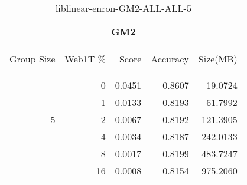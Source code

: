\begin{center}
\begin{table}[htbp] 
 \begin{center}
\begin{tabular}{ | r | r | r | r | r |}
\hline
\multicolumn{5}{|c|}{GM2}\\
\hline
\begin{sideways}Group Size\end{sideways} & \begin{sideways}Web1T \%\end{sideways} & \begin{sideways}Score\end{sideways} & \begin{sideways}Accuracy\end{sideways} & \begin{sideways}Size(MB)\end{sideways}\\
\hline
\multirow{5}{*}{5}
 & 0 & 0.0451 & 0.8607 & 19.0724\\ \cline{2-5}
 & 1 & 0.0133 & 0.8193 & 61.7992\\ \cline{2-5}
 & 2 & 0.0067 & 0.8192 & 121.3905\\ \cline{2-5}
 & 4 & 0.0034 & 0.8187 & 242.0133\\ \cline{2-5}
 & 8 & 0.0017 & 0.8199 & 483.7247\\ \cline{2-5}
 & 16 & 0.0008 & 0.8154 & 975.2060\\ \cline{2-5}
\hline
\end{tabular}
\caption{liblinear-enron-GM2-ALL-ALL-5}
\label{table:liblinear-enron-GM2-ALL-ALL-5}
\end{center}
 \end{table}
\end{center}

